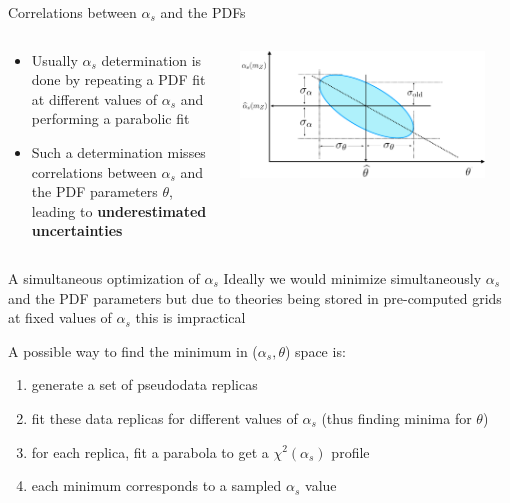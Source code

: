 \documentclass[8pt,t]{beamer}
\begin{document}
\begin{frame}{Correlations between $\alpha_s$ and the PDFs}
  \begin{columns}[T]
    \begin{column}{0.49\textwidth}
      \begin{itemize}
        \item Usually $\alpha_s$ determination is done by repeating a PDF fit at different values of $\alpha_s$ and performing a parabolic fit
        \item Such a determination misses correlations between $\alpha_s$ and the PDF parameters $\theta$, leading to \textbf{underestimated uncertainties}
      \end{itemize}
    \end{column}
    \begin{column}{0.49\textwidth}
      \includegraphics[width=0.9\textwidth]{ellipse.pdf}
    \end{column}
  \end{columns}
\end{frame}


\begin{frame}{A simultaneous optimization of $\alpha_s$}
  Ideally we would minimize simultaneously $\alpha_s$ and the PDF parameters but due to theories being stored in pre-computed grids at fixed values of $\alpha_s$ this is impractical


  \vspace*{1em}

  A possible way to find the minimum in ($\alpha_s, \theta$) space is:
  \begin{enumerate}
    \item generate a set of pseudodata replicas
    \item fit these data replicas for different values of $\alpha_s$ (thus finding minima for $\theta$)
    \item for each replica, fit a parabola to get a $\chi^2(\alpha_s)$ profile
    \item each minimum corresponds to a sampled $\alpha_s$ value
  \end{enumerate}

\end{frame}
\end{document}

